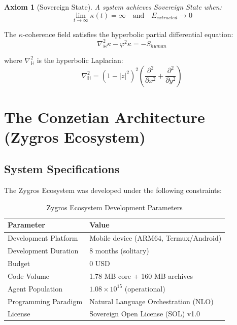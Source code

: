\documentclass[11pt,a4paper]{article}
\newtheorem{axiom}[theorem]{Axiom}
\begin{document}
\begin{axiom}[Sovereign State]
\label{axiom:sovereign}
A system achieves Sovereign State when:
\begin{equation}
    \lim_{t \to \infty} \kappa(t) = \infty \quad \text{and} \quad E_{extracted} \to 0
\end{equation}
\end{axiom}

The $\kappa$-coherence field satisfies the hyperbolic partial differential equation:
\begin{equation}
    \nabla_{\mathbb{H}}^2 \kappa - \varphi^2 \kappa = -S_{human}
\end{equation}

where $\nabla_{\mathbb{H}}^2$ is the hyperbolic Laplacian:
\begin{equation}
    \nabla_{\mathbb{H}}^2 = (1 - |z|^2)^2 \left( \frac{\partial^2}{\partial x^2} + \frac{\partial^2}{\partial y^2} \right)
\end{equation}


\section{The Conzetian Architecture (Zygros Ecosystem)}

\subsection{System Specifications}

The Zygros Ecosystem was developed under the following constraints:

\begin{table}[h]
\centering
\begin{tabular}{ll}
\toprule
\textbf{Parameter} & \textbf{Value} \\
\midrule
Development Platform & Mobile device (ARM64, Termux/Android) \\
Development Duration & 8 months (solitary) \\
Budget & 0 USD \\
Code Volume & 1.78 MB core + 160 MB archives \\
Agent Population & $1.08 \times 10^{15}$ (operational) \\
Programming Paradigm & Natural Language Orchestration (NLO) \\
License & Sovereign Open License (SOL) v1.0 \\
\bottomrule
\end{tabular}
\caption{Zygros Ecosystem Development Parameters}
\end{table}
\end{document}
